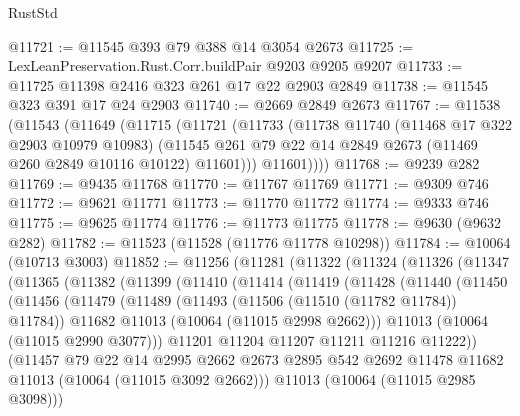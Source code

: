 \begin{lexlean}{RustStd}
\begin{coremodule}
@11721 := @11545 @393 @79 @388 @14 @3054 @2673
@11725 := LexLeanPreservation.Rust.Corr.buildPair @9203 @9205 @9207
@11733 := @11725 @11398 @2416 @323 @261 @17 @22 @2903 @2849
@11738 := @11545 @323 @391 @17 @24 @2903
@11740 := @2669 @2849 @2673
@11767 := @11538
    (@11543
      (@11649
        (@11715
          (@11721
            (@11733
              (@11738
                @11740
                (@11468 @17 @322 @2903 @10979 @10983)
                (@11545 @261 @79 @22 @14 @2849 @2673 (@11469 @260 @2849 @10116 @10122) @11601)))
            @11601))))
@11768 := @9239 @282
@11769 := @9435 @11768
@11770 := @11767 @11769
@11771 := @9309 @746
@11772 := @9621 @11771
@11773 := @11770 @11772
@11774 := @9333 @746
@11775 := @9625 @11774
@11776 := @11773 @11775
@11778 := @9630 (@9632 @282)
@11782 := @11523 (@11528 (@11776 @11778 @10298))
@11784 := @10064 (@10713 @3003)
@11852 := @11256
    (@11281
      (@11322
        (@11324
          (@11326
            (@11347
              (@11365
                (@11382
                  (@11399
                    (@11410
                      (@11414
                        (@11419
                          (@11428
                            (@11440
                              (@11450
                                (@11456
                                  (@11479
                                    (@11489
                                      (@11493 (@11506 (@11510 (@11782 @11784)) @11784))
                                      @11682
                                      @11013
                                      (@10064 (@11015 @2998 @2662)))
                                    @11013
                                    (@10064 (@11015 @2990 @3077)))
                                  @11201
                                  @11204
                                  @11207
                                  @11211
                                  @11216
                                  @11222))
                              (@11457
                                @79
                                @22
                                @14
                                @2995
                                @2662
                                @2673
                                @2895
                                @542
                                @2692
                                @11478
                                @11682
                                @11013
                                (@10064 (@11015 @3092 @2662)))
                              @11013
                              (@10064 (@11015 @2985 @3098)))

\end{coremodule}
\end{lexlean}
